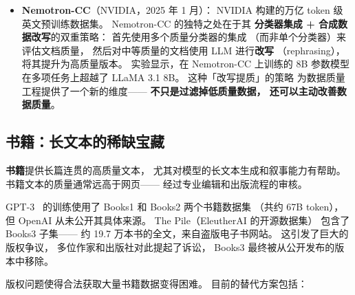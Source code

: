\begin{itemize}[noitemsep]
  \item \textbf{Nemotron-CC}（NVIDIA，2025 年 1 月）：
        NVIDIA 构建的万亿 token 级英文预训练数据集。
        Nemotron-CC 的独特之处在于其
        \textbf{分类器集成 + 合成数据改写}的双重策略：
        首先使用多个质量分类器的集成
        （而非单个分类器）来评估文档质量，
        然后对中等质量的文档使用 LLM 进行\textbf{改写}
        （rephrasing），将其提升为高质量版本。
        实验显示，在 Nemotron-CC 上训练的 8B 参数模型
        在多项任务上超越了 LLaMA 3.1 8B。
        这种「改写提质」的策略
        为数据质量工程提供了一个新的维度——
        \textbf{不只是过滤掉低质量数据，
        还可以主动改善数据质量}。
\end{itemize}

\subsection{书籍：长文本的稀缺宝藏}

\textbf{书籍}提供长篇连贯的高质量文本，
尤其对模型的长文本生成和叙事能力有帮助。
书籍文本的质量通常远高于网页——
经过专业编辑和出版流程的审核。

GPT-3~\cite{brown2020gpt3} 的训练使用了
Books1 和 Books2 两个书籍数据集
（共约 67B token），
但 OpenAI 从未公开其具体来源。
The Pile（EleutherAI 的开源数据集）
包含了 Books3 子集——
约 19.7 万本书的全文，来自盗版电子书网站。
这引发了巨大的版权争议，
多位作家和出版社对此提起了诉讼，
Books3 最终被从公开发布的版本中移除。

版权问题使得合法获取大量书籍数据变得困难。
目前的替代方案包括：

